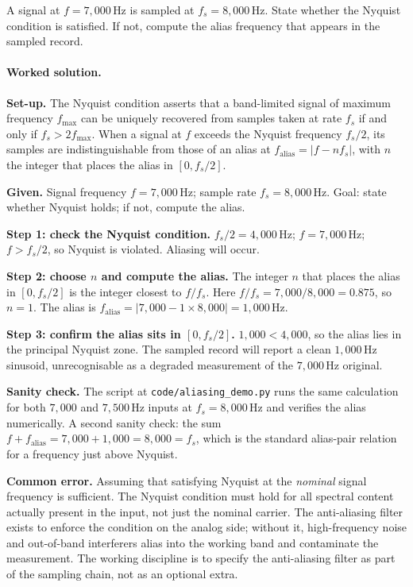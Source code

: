\begin{exercise}
A signal at $f = 7{,}000 \,\si{\hertz}$ is sampled at $f_{s} = 8{,}000
\,\si{\hertz}$. State whether the Nyquist condition is satisfied. If
not, compute the alias frequency that appears in the sampled record.

\paragraph{Worked solution.}
\textbf{Set-up.} The Nyquist condition asserts that a band-limited
signal of maximum frequency $f_{\text{max}}$ can be uniquely
recovered from samples taken at rate $f_{s}$ if and only if
$f_{s} > 2 f_{\text{max}}$. When a signal at $f$ exceeds the
Nyquist frequency $f_{s}/2$, its samples are indistinguishable
from those of an alias at $f_{\text{alias}} = |f - n f_{s}|$, with
$n$ the integer that places the alias in $[0, f_{s}/2]$.

\textbf{Given.} Signal frequency $f = 7{,}000 \,\si{\hertz}$;
sample rate $f_{s} = 8{,}000 \,\si{\hertz}$. Goal: state whether
Nyquist holds; if not, compute the alias.

\textbf{Step 1: check the Nyquist condition.}
$f_{s}/2 = 4{,}000 \,\si{\hertz}$; $f = 7{,}000 \,\si{\hertz}$;
$f > f_{s}/2$, so Nyquist is violated. Aliasing will occur.

\textbf{Step 2: choose $n$ and compute the alias.} The integer
$n$ that places the alias in $[0, f_{s}/2]$ is the integer
closest to $f/f_{s}$. Here $f/f_{s} = 7{,}000/8{,}000 = 0.875$,
so $n = 1$. The alias is $f_{\text{alias}} = |7{,}000 - 1 \times
8{,}000| = 1{,}000 \,\si{\hertz}$.

\textbf{Step 3: confirm the alias sits in $[0, f_{s}/2]$.}
$1{,}000 < 4{,}000$, so the alias lies in the principal Nyquist
zone. The sampled record will report a clean $1{,}000 \,\si
{\hertz}$ sinusoid, unrecognisable as a degraded measurement of
the $7{,}000 \,\si{\hertz}$ original.

\textbf{Sanity check.} The script at
\texttt{code/aliasing\_demo.py} runs the same calculation for
both $7{,}000$ and $7{,}500 \,\si{\hertz}$ inputs at $f_{s} =
8{,}000 \,\si{\hertz}$ and verifies the alias numerically. A
second sanity check: the sum $f + f_{\text{alias}} = 7{,}000 +
1{,}000 = 8{,}000 = f_{s}$, which is the standard alias-pair
relation for a frequency just above Nyquist.

\textbf{Common error.} Assuming that satisfying Nyquist at the
\emph{nominal} signal frequency is sufficient. The Nyquist
condition must hold for all spectral content actually present in
the input, not just the nominal carrier. The anti-aliasing filter
exists to enforce the condition on the analog side; without it,
high-frequency noise and out-of-band interferers alias into the
working band and contaminate the measurement. The working
discipline is to specify the anti-aliasing filter as part of the
sampling chain, not as an optional extra.
\end{exercise}

